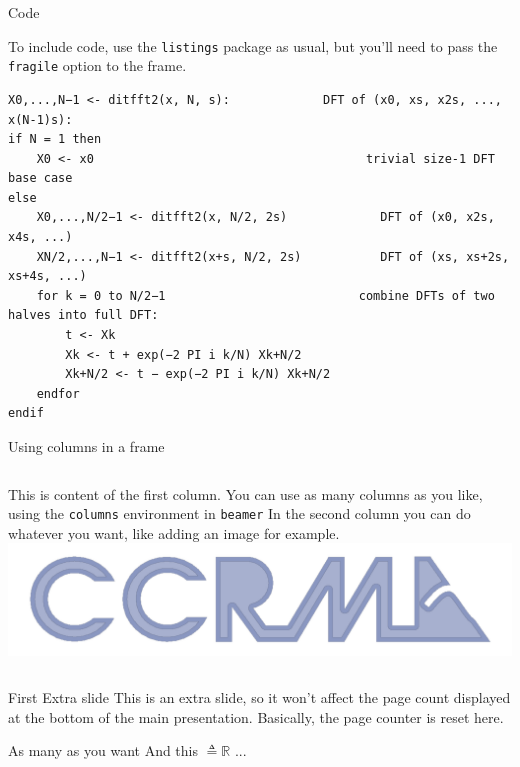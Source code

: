 \documentclass{beamer}
\begin{document}
\begin{frame}[fragile]{Code}

    To include code, use the \texttt{listings} package as usual, but you'll need
    to pass the \texttt{fragile} option to the frame.

    \vspace{1cm}

    {
    \tiny
    \begin{lstlisting}
X0,...,N−1 <- ditfft2(x, N, s):             DFT of (x0, xs, x2s, ..., x(N-1)s):
if N = 1 then
    X0 <- x0                                      trivial size-1 DFT base case
else
    X0,...,N/2−1 <- ditfft2(x, N/2, 2s)             DFT of (x0, x2s, x4s, ...)
    XN/2,...,N−1 <- ditfft2(x+s, N/2, 2s)           DFT of (xs, xs+2s, xs+4s, ...)
    for k = 0 to N/2−1                           combine DFTs of two halves into full DFT:
        t <- Xk
        Xk <- t + exp(−2 PI i k/N) Xk+N/2
        Xk+N/2 <- t − exp(−2 PI i k/N) Xk+N/2
    endfor
endif
    \end{lstlisting}
    }


\end{frame}


\begin{frame}{Using columns in a frame}
    \begin{columns}[t]
            This is content of the first column. You can use as many columns as you like, using the \texttt{columns} environment in \texttt{beamer}
            In the second column you can do whatever you want, like adding an image for example.
            \includegraphics[width=\textwidth]{ccrma-logo.pdf}
    \end{columns}
\end{frame}



\appendix  %

\begin{frame}[plain]{First Extra slide}
This is an extra slide, so it won't affect the page count displayed at the bottom of the main presentation. Basically, the page counter is reset here.
\end{frame}

\begin{frame}[plain]{As many as you want}
And this $\triangleq \mathbb{R}$ ...
\end{frame}
\end{document}
